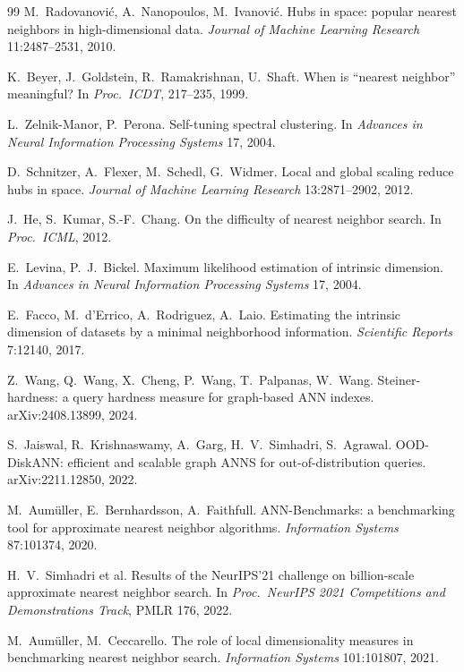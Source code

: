 \documentclass[11pt]{article}
\begin{document}
\begin{thebibliography}{99}
M.~Radovanovi\'c, A.~Nanopoulos, M.~Ivanovi\'c.
Hubs in space: popular nearest neighbors in high-dimensional data.
\emph{Journal of Machine Learning Research} 11:2487--2531, 2010.

K.~Beyer, J.~Goldstein, R.~Ramakrishnan, U.~Shaft.
When is ``nearest neighbor'' meaningful?
In \emph{Proc.\ ICDT}, 217--235, 1999.

L.~Zelnik-Manor, P.~Perona.
Self-tuning spectral clustering.
In \emph{Advances in Neural Information Processing Systems} 17, 2004.

D.~Schnitzer, A.~Flexer, M.~Schedl, G.~Widmer.
Local and global scaling reduce hubs in space.
\emph{Journal of Machine Learning Research} 13:2871--2902, 2012.

J.~He, S.~Kumar, S.-F.~Chang.
On the difficulty of nearest neighbor search.
In \emph{Proc.\ ICML}, 2012.

E.~Levina, P.~J.~Bickel.
Maximum likelihood estimation of intrinsic dimension.
In \emph{Advances in Neural Information Processing Systems} 17, 2004.

E.~Facco, M.~d'Errico, A.~Rodriguez, A.~Laio.
Estimating the intrinsic dimension of datasets by a minimal neighborhood
information. \emph{Scientific Reports} 7:12140, 2017.

Z.~Wang, Q.~Wang, X.~Cheng, P.~Wang, T.~Palpanas, W.~Wang.
Steiner-hardness: a query hardness measure for graph-based ANN indexes.
arXiv:2408.13899, 2024.

S.~Jaiswal, R.~Krishnaswamy, A.~Garg, H.~V.~Simhadri, S.~Agrawal.
OOD-DiskANN: efficient and scalable graph ANNS for out-of-distribution
queries. arXiv:2211.12850, 2022.

M.~Aum\"uller, E.~Bernhardsson, A.~Faithfull.
ANN-Benchmarks: a benchmarking tool for approximate nearest neighbor
algorithms. \emph{Information Systems} 87:101374, 2020.

H.~V.~Simhadri et al.
Results of the NeurIPS'21 challenge on billion-scale approximate nearest
neighbor search. In \emph{Proc.\ NeurIPS 2021 Competitions and Demonstrations
Track}, PMLR 176, 2022.

M.~Aum\"uller, M.~Ceccarello.
The role of local dimensionality measures in benchmarking nearest neighbor
search. \emph{Information Systems} 101:101807, 2021.


\end{thebibliography}
\end{document}
